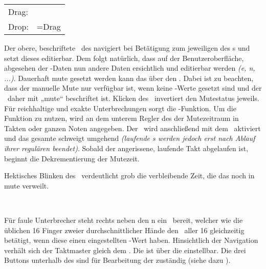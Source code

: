 \documentclass[10pt,final,a4paper]{report}
\begin{document}
\begin{tabular}{ll}
	Drag: 	& \SecRef{GuiDragNdropPattern}\\ 
	Drop: 	& =Drag
\end{tabular}
%
%
%
Der obere, beschriftete \navibutton~des  navigiert bei Betätigung zum jeweiligen  des s und setzt dieses editierbar. Dem folgt natürlich, dass auf der Benutzeroberfläche, abgesehen der -Daten nun andere Daten ersichtlich und editierbar werden \textit{(e, n, ...)}.
%
%
%
Dauerhaft mute gesetzt werden kann das  über den \mutebutton . Dabei ist zu beachten, dass der manuelle Mute nur verfügbar ist, wenn keine -Werte gesetzt sind und der \mutebutton~daher mit „mute“ beschriftet ist. Klicken des \mutebutton~invertiert den Mutestatus jeweils.
%
%
%
Für reichhaltige und exakte Unterbrechungen sorgt die \timemute -Funktion.
Um die Funktion zu nutzen, wird an dem unterem Regler des  der Mutezeitraum in Takten oder ganzen Noten angegeben. Der \timemute~wird anschließend mit dem \mutebutton~aktiviert und das gesamte  schweigt umgehend \textit{(laufende s werden jedoch erst nach Ablauf ihrer regulären  beendet)}. Sobald der angerissene, laufende Takt abgelaufen ist, beginnt die Dekrementierung der Mutezeit. 

Hektisches Blinken des \mutebutton~verdeutlicht grob die verbleibende Zeit, die das  noch in mute verweilt.

~

Für faule Unterbrecher steht rechts neben den n ein \stackmutebutton~bereit, welcher wie die üblichen 16 Finger zweier durchschnittlicher Hände den \mutebutton~aller 16  gleichzeitig betätigt, wenn diese einen eingestellten \timemute-Wert haben.
%
%
%
Hinsichtlich der Navigation verhält sich der Taktmaster gleich dem . Die  ist über die  einstellbar. 
Die drei Buttons unterhalb des  sind für Bearbeitung der  zuständig (siehe dazu ).
\end{document}
